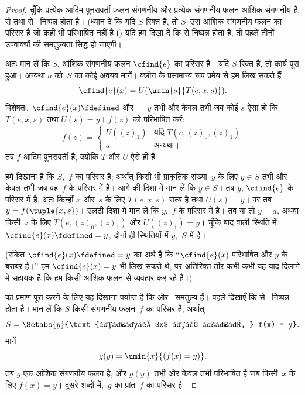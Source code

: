 \documentclass[../../../include/open-logic-section]{subfiles}
\begin{document}
\begin{proof}
चूँकि प्रत्येक आदिम पुनरावर्ती फलन संगणनीय और प्रत्येक संगणनीय फलन
आंशिक संगणनीय है,  से  तथा
 से~ निष्पन्न होता है। (ध्यान दें कि
यदि $S$ रिक्त है, तो $S$~उस आंशिक संगणनीय फलन का परिसर है जो कहीं भी
परिभाषित नहीं है।) यदि हम दिखा दें कि  से
 निष्पन्न होता है, तो पहले तीनों उपवाक्यों की
समतुल्यता सिद्ध हो जाएगी।

अतः मान लें कि $S$, आंशिक संगणनीय फलन $\cfind{e}$ का परिसर है। यदि $S$
रिक्त है, तो कार्य पूरा हुआ। अन्यथा $a$ को~$S$ का कोई अवयव मानें। क्लीन
के प्रसामान्य रूप प्रमेय से हम लिख सकते हैं
\[
\cfind{e}(x) = U(\umin{s}{T(e, x, s)}).
\]
विशेषतः, $\cfind{e}(x) \fdefined$ और $= y$ तभी और केवल तभी जब कोई $s$
ऐसा हो कि $T(e, x, s)$ तथा $U(s) = y$। $f(z)$ को परिभाषित करें:
\[
f(z) = \begin{cases}
  U((z)_1) & \text{यदि $T(e, (z)_0, (z)_1)$} \\
  a        & \text{अन्यथा।}
\end{cases}
\]
तब $f$ आदिम पुनरावर्ती है, क्योंकि $T$ और $U$ ऐसे ही हैं।

हमें दिखाना है कि $S$,~$f$ का परिसर है; अर्थात् किसी भी प्राकृतिक
संख्या~$y$ के लिए $y \in S$ तभी और केवल तभी जब वह~$f$ के परिसर में है।
आगे की दिशा में मान लें कि $y \in S$। तब $y$, $\cfind{e}$ के परिसर में
है, अतः किन्हीं $x$ और~$s$ के लिए $T(e,x,s)$ सत्य है तथा $U(s) = y$।
पर तब $y = f(\tuple{x,s})$। उलटी दिशा में मान लें कि $y$,~$f$ के परिसर
में है। तब या तो $y = a$, अथवा किसी~$z$ के लिए $T(e,(z)_0,(z)_1)$ और
$U((z)_1) = y$। चूँकि बाद वाली स्थिति में $\cfind{e}(x) \fdefined =
y$,
दोनों ही स्थितियों में $y$,~$S$ में है।

(संकेत $\cfind{e}(x) \fdefined = y$ का अर्थ है कि ``$\cfind{e}(x)$
परिभाषित और $y$ के बराबर है।'' हम $\cfind{e}(x) =
y$ भी लिख सकते थे,
पर अतिरिक्त तीर कभी-कभी यह याद दिलाने में सहायक है कि हम किसी आंशिक
फलन से व्यवहार कर रहे हैं।)

 का प्रमाण पूरा करने के लिए यह दिखाना पर्याप्त है कि
 और~ समतुल्य हैं। पहले दिखाएँ कि
 से~ निष्पन्न होता है। मान लें कि
$S$ किसी संगणनीय फलन~$f$ का परिसर है, अर्थात्
\[
S = \Setabs{y}{\text{किसी $x$ के लिए, } f(x) = y}.
\]
मानें
\[
g(y) = \umin{x}{(f(x) = y)}.
\]
तब $g$ एक आंशिक संगणनीय फलन है, और $g(y)$ तभी और केवल तभी परिभाषित है
जब किसी~$x$ के लिए $f(x) = y$। दूसरे शब्दों में,~$g$ का प्रांत~$f$ का
परिसर है। 


\end{proof}
\end{document}
